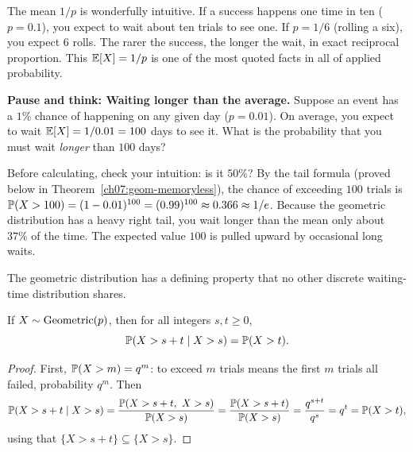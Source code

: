 \begin{intuitionbox}
The mean $1/p$ is wonderfully intuitive. If a success happens one time in ten
($p = 0.1$), you expect to wait about ten trials to see one. If $p = 1/6$ (rolling
a six), you expect $6$ rolls. The rarer the success, the longer the wait, in exact
reciprocal proportion. This $\E[X] = 1/p$ is one of the most quoted facts in all
of applied probability.
\end{intuitionbox}

\begin{recoverybox}
\textbf{Pause and think: Waiting longer than the average.}
Suppose an event has a $1\%$ chance of happening on any given day ($p = 0.01$).
On average, you expect to wait $\E[X] = 1/0.01 = 100$ days to see it.
What is the probability that you must wait \emph{longer} than $100$ days?

Before calculating, check your intuition: is it $50\%$?
By the tail formula (proved below in Theorem~\ref{ch07:geom-memoryless}), the chance of exceeding $100$ trials is
$\P(X > 100) = (1 - 0.01)^{100} = (0.99)^{100} \approx 0.366 \approx 1/e$.
Because the geometric distribution has a heavy right tail, you wait longer than
the mean only about $37\%$ of the time. The expected value $100$ is pulled upward
by occasional long waits.
\end{recoverybox}

The geometric distribution has a defining property that no other
discrete waiting-time distribution shares.

\begin{theorem}[Memorylessness]
\label{ch07:geom-memoryless}
If $X \sim \Geom(p)$, then for all integers $s, t \ge 0$,
\[
  \P(X > s + t \given X > s) = \P(X > t).
\]
\end{theorem}

\begin{proof}
First, $\P(X > m) = q^{m}$: to exceed $m$ trials means the first $m$ trials all
failed, probability $q^m$. Then
\[
  \P(X > s+t \given X > s)
  = \frac{\P(X > s+t,\ X > s)}{\P(X > s)}
  = \frac{\P(X > s+t)}{\P(X > s)}
  = \frac{q^{s+t}}{q^{s}} = q^{t} = \P(X > t),
\]
using that $\{X > s+t\} \subseteq \{X > s\}$.
\end{proof}

